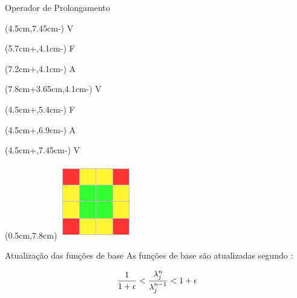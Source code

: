 \documentclass[professionalfont]{beamer}
\begin{document}
\begin{frame}{Operador de Prolongamento}
    \begin{textblock*}{5cm}(4.5cm,7.45cm-\deltaimggg)
        V
    \end{textblock*}

    \begin{textblock*}{5cm}(5.7cm+\deltaimg,4.1cm-\deltaimggg)
        F
    \end{textblock*}

    \begin{textblock*}{5cm}(7.2cm+\deltaimg,4.1cm-\deltaimggg)
        A
    \end{textblock*}

    \begin{textblock*}{5cm}(7.8cm+3.65cm,4.1cm-\deltaimggg)
        V
    \end{textblock*}

    \begin{textblock*}{5cm}(4.5cm+\deltaimgg,5.4cm-\deltaimggg)
        F
    \end{textblock*}

    \begin{textblock*}{5cm}(4.5cm+\deltaimgg,6.9cm-\deltaimggg)
        A
    \end{textblock*}

    \begin{textblock*}{5cm}(4.5cm+\deltaimgg,7.45cm-\deltaimggg)
        V
    \end{textblock*}

    \begin{textblock*}{5cm}(0.5cm,7.8cm)
        \includegraphics[scale=0.3]{./imgs/dual_min.png}
    \end{textblock*}

\end{frame}

\begin{frame}{Atualização das funções de base}
    As funções de base são atualizadas segundo : 
    

\begin{equation}
    \dfrac{1}{1+\epsilon} < \dfrac{\lambda_{j}^{n}}{\lambda_{j}^{n-1}}  < 1 + \epsilon  
    \label{eq:update_bf.1}
\end{equation}
\end{frame}
\end{document}
